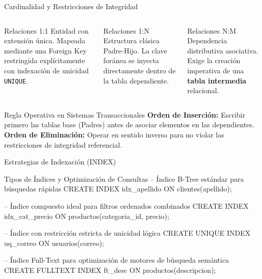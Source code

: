 \documentclass[12pt, aspectratio=169, UTF8]{beamer}
\begin{document}
\begin{frame}{Cardinalidad y Restricciones de Integridad}
  \begin{columns}[T]
      \begin{block}{Relaciones 1:1}
        \footnotesize Entidad con extensión única. Mapeada mediante una Foreign Key restringida explícitamente con indexación de unicidad \texttt{UNIQUE}.
      \end{block}
      \begin{block}{Relaciones 1:N}
        \footnotesize Estructura clásica Padre-Hijo. La clave foránea se inyecta directamente dentro de la tabla dependiente.
      \end{block}
      \begin{block}{Relaciones N:M}
        \footnotesize Dependencia distributiva asociativa. Exige la creación imperativa de una \textbf{tabla intermedia} relacional.
      \end{block}
  \end{columns}
  \vspace{10pt}
  \begin{alertblock}{Regla Operativa en Sistemas Transaccionales}
    \textbf{Orden de Inserción:} Escribir primero las tablas base (Padres) antes de asociar elementos en las dependientes.\\
    \textbf{Orden de Eliminación:} Operar en sentido inverso para no violar las restricciones de integridad referencial.
  \end{alertblock}
\end{frame}


\begin{frame}[fragile]{Estrategias de Indexación (INDEX)}
  \begin{sqlbox}{Tipos de Índices y Optimización de Consultas}
-- Índice B-Tree estándar para búsquedas rápidas
CREATE INDEX idx_apellido ON clientes(apellido);

-- Índice compuesto ideal para filtros ordenados combinados
CREATE INDEX idx_cat_precio ON productos(categoria_id, precio);

-- Índice con restricción estricta de unicidad lógica
CREATE UNIQUE INDEX uq_correo ON usuarios(correo);

-- Índice Full-Text para optimización de motores de búsqueda semántica
CREATE FULLTEXT INDEX ft_desc ON productos(descripcion);
  \end{sqlbox}
\end{frame}
\end{document}
